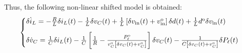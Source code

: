 Thus, the following non-linear shifted model is obtained:
\begin{equation}
  \begin{cases}
    \delta \dot i_L = - \frac{R}{L} \delta i_L(t) - \frac{1}{L} \delta v_C(t)
    + \frac{1}{L} \left[\delta v_{\rm{in}}(t) + v_{\rm{in}}^{\rm o}\right] \delta d(t)
    + \frac{1}{L} d^{\rm o} \delta v_{\rm in}(t) \\[8pt]
    \delta \dot v_C = \frac{1}{C} \delta i_L(t) - \frac{1}{C}\left[\frac{1}{R} - \frac{P_{\ell}^{\rm o}}{v_C^{\rm o} \left[\delta v_C(t) + v_C^{\rm o}\right]}\right] \delta v_C(t)
    - \frac{1}{C \left[\delta v_C(t) + v_C^{\rm o}\right]} \delta P_{\ell}(t)
  \end{cases}
  \label{eq:buck_conveter_nonlinear_model_sat}
\end{equation}

